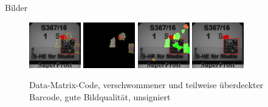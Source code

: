 \documentclass{beamer}
\begin{document}
  \begin{frame}{Bilder}
    \begin{figure}
      \includegraphics[width=0.2\textwidth]{./assets/S2016000367P1-S-1_S-HE_0000000000008E83-label_top1_positiveonlywithrest.jpg}
      \hfill
      \includegraphics[width=0.2\textwidth]{./assets/S2016000367P1-S-1_S-HE_0000000000008E83-label_top1_positiveonly.jpg}
      \hfill
      \includegraphics[width=0.2\textwidth]{./assets/S2016000367P1-S-1_S-HE_0000000000008E83-label_top1_proscons.jpg}
      \hfill
      \includegraphics[width=0.2\textwidth]{./assets/S2016000367P1-S-1_S-HE_0000000000008E83-label_top1_prosconsminweight.jpg}
      \caption{Data-Matrix-Code, verschwommener und teilweise überdeckter Barcode, gute Bildqualität, unsigniert}
    \end{figure}
  \end{frame}
\end{document}
